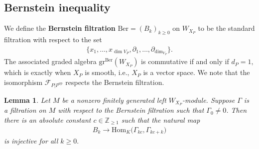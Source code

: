 \documentclass[11pt,a4paper,usenames,dvipsnames,reqno]{amsart}
\numberwithin{equation}{section}
\newcommand{\zz}{\mathbb Z}
\newtheorem{Lem}[Thm]{Lemma}
\theoremstyle{definition}
\theoremstyle{remark}
\begin{document}
\subsection{Bernstein inequality}

We define the \textbf{Bernstein filtration} $\mathrm{Ber}=(B_k)_{k\ge 0}$ on $W_{X_P}$ to be the standard filtration with respect to the set
\begin{align*}
    \{x_1,\ldots, x_{\dim V_{P}},\partial_1,\ldots,\partial_{\dim_{V_P}}\}.
\end{align*}
The associated graded algebra $\mathrm{gr}^{\mathrm{Ber}}(W_{X_P})$ is commutative if and only if $d_P=1,$ which is exactly when $X_P$ is smooth, i.e., $X_P$ is a vector space. We note that the isomorphism $\mathcal{F}_{P|P^{\mathrm{op}}}$ respects the Bernstein filtration.

\begin{Lem}\label{lem:prebernstein}
Let $M$ be a nonzero finitely generated left $W_{X_P}$-module. Suppose $\Gamma$ is a filtration on $M$ with respect to the Bernstein filtration such that $\Gamma_0\neq 0$. Then there is an absolute constant $c\in \zz_{\ge 1}$ such that the natural map
\begin{align*}
    B_k\longrightarrow \mathrm{Hom}_K\big(\Gamma_{kc},\Gamma_{kc+k}\big)
\end{align*}
is injective for all $k\ge 0.$
\end{Lem}
\end{document}
